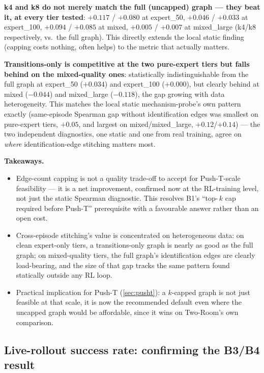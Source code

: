\documentclass[11pt]{article}
\begin{document}
\textbf{k4 and k8 do not merely match the full (uncapped) graph --- they beat it, at every tier
tested}: $+0.117$ / $+0.080$ at expert\_50, $+0.046$ / $+0.033$ at expert\_100, $+0.094$ / $+0.085$
at mixed, $+0.005$ / $+0.007$ at mixed\_large (k4/k8 respectively, vs.\ the full graph). This
directly extends the local static finding (capping costs nothing, often helps) to the metric that
actually matters.

\textbf{Transitions-only is competitive at the two pure-expert tiers but falls behind on the
mixed-quality ones}: statistically indistinguishable from the full graph at expert\_50
($+0.034$) and expert\_100 ($+0.000$), but clearly behind at mixed ($-0.044$) and mixed\_large
($-0.118$), the gap growing with data heterogeneity. This matches the local static
mechanism-probe's own pattern exactly (same-episode Spearman gap without identification edges was
smallest on pure-expert tiers, $+0.05$, and largest on mixed/mixed\_large, $+0.12$/$+0.14$) --- the
two independent diagnostics, one static and one from real training, agree on \emph{where}
identification-edge stitching matters most.

\textbf{Takeaways.}
\begin{itemize}[leftmargin=1.4em,itemsep=2pt]
\item Edge-count capping is not a quality trade-off to accept for Push-T-scale feasibility --- it
is a net improvement, confirmed now at the RL-training level, not just the static Spearman
diagnostic. This resolves B1's ``top-\,$k$ cap required before Push-T'' prerequisite with a
favourable answer rather than an open cost.
\item Cross-episode stitching's value is concentrated on heterogeneous data: on clean expert-only
tiers, a transitions-only graph is nearly as good as the full graph; on mixed-quality tiers, the
full graph's identification edges are clearly load-bearing, and the size of that gap tracks the
same pattern found statically outside any RL loop.
\item Practical implication for Push-T (\cref{sec:pusht}): a $k$-capped graph is not just feasible
at that scale, it is now the recommended default even where the uncapped graph would be
affordable, since it wins on Two-Room's own comparison.
\end{itemize}

\subsection{Live-rollout success rate: confirming the B3/B4 result}
\label{sec:actor-rollout}
\end{document}
